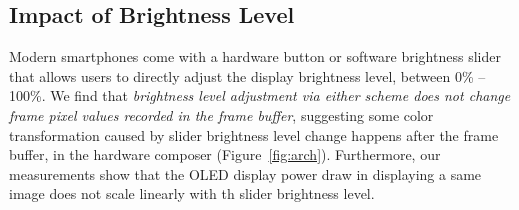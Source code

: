 % 
% 
% 
% 

\subsection{Impact of Brightness Level}
\label{subsec:brightness}

Modern smartphones come with a hardware button or software brightness
slider that allows users to directly adjust the display brightness
level, \eg between 0\% -- 100\%.  We find that {\em brightness level
  adjustment via either scheme does not change frame pixel values
  recorded in the frame buffer}, suggesting some color transformation
caused by slider brightness level change happens after the frame
buffer, \ie in the hardware composer (Figure~\ref{fig:arch}). 
Furthermore, our measurements show that 
the OLED display power draw in displaying a same image
does not scale linearly with th slider brightness level.

